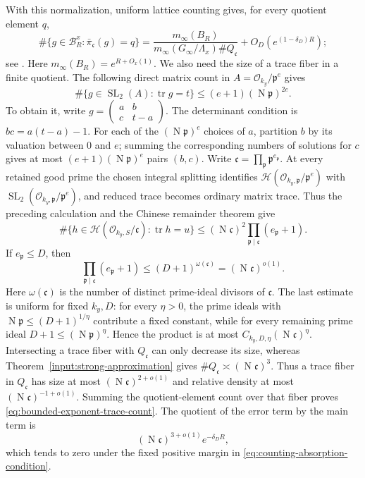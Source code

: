 \documentclass[11pt,reqno]{amsart}
\theoremstyle{definition}
\theoremstyle{remark}
\newcommand{\cO}{\mathcal O}
\newcommand{\cB}{\mathcal B}
\newcommand{\Tr}{\operatorname{tr}}
\newcommand{\SL}{\operatorname{SL}}
\newcommand{\Norm}{\operatorname{N}}
\begin{document}
With this normalization, uniform lattice counting gives, for every quotient
element \(q\),
\[
 \#\{g\in\cB_R^x:\bar\pi_{\mathfrak c}(g)=q\}
 =\frac{m_\infty(B_R)}
        {m_\infty(G_\infty/\Lambda_x)\#Q_{\mathfrak c}}
  +O_D(e^{(1-\delta_D)R});
\]
see \cite[Theorem~1.9 and Corollaries~1.11, 1.13]
{GorodnikNevoCounting}.  Here \(m_\infty(B_R)=e^{R+O_x(1)}\).  We also need
the size of a trace fiber in a finite quotient.  The following direct
matrix count in
\(A=\cO_{k_y}/\mathfrak p^e\) gives
\[
 \#\{g\in\SL_2(A):\Tr g=t\}\le(e+1)(\Norm\mathfrak p)^{2e}.
\]
To obtain it, write
\(g=\left(\begin{smallmatrix}a&b\\c&t-a\end{smallmatrix}\right)\).
The determinant condition is \(bc=a(t-a)-1\).  For each of the
\((\Norm\mathfrak p)^e\) choices of \(a\), partition \(b\) by its valuation
between \(0\) and \(e\); summing the corresponding numbers of solutions for
\(c\) gives at most \((e+1)(\Norm\mathfrak p)^e\) pairs \((b,c)\).
Write \(\mathfrak c=\prod_{\mathfrak p}\mathfrak p^{e_{\mathfrak p}}\).
At every retained good prime the chosen integral splitting identifies
\(\mathcal H(\cO_{k_y,\mathfrak p}/\mathfrak p^e)\) with
\(\SL_2(\cO_{k_y,\mathfrak p}/\mathfrak p^e)\), and reduced trace becomes
ordinary matrix trace.  Thus the preceding calculation and the Chinese
remainder theorem give
\[
 \#\{h\in\mathcal H(\cO_{k_y,S}/\mathfrak c):\Tr h=u\}
 \le (\Norm\mathfrak c)^2
       \prod_{\mathfrak p\mid\mathfrak c}(e_{\mathfrak p}+1).
\]
If \(e_{\mathfrak p}\le D\), then
\[
 \prod_{\mathfrak p\mid\mathfrak c}(e_{\mathfrak p}+1)
 \le (D+1)^{\omega(\mathfrak c)}
 = (\Norm\mathfrak c)^{o(1)}.
\]
Here \(\omega(\mathfrak c)\) is the number of distinct prime-ideal divisors
of \(\mathfrak c\).
The last estimate is uniform for fixed \(k_y,D\): for every \(\eta>0\),
the prime ideals with
\(\Norm\mathfrak p\le(D+1)^{1/\eta}\) contribute a fixed constant, while
for every remaining prime ideal
\(D+1\le(\Norm\mathfrak p)^\eta\).  Hence the product is at most
\(C_{k_y,D,\eta}(\Norm\mathfrak c)^\eta\).
Intersecting a trace fiber with \(Q_{\mathfrak c}\) can only decrease its
size, whereas Theorem~\ref{input:strong-approximation} gives
\(\#Q_{\mathfrak c}\asymp(\Norm\mathfrak c)^3\).  Thus a trace fiber in
\(Q_{\mathfrak c}\) has size at most
\((\Norm\mathfrak c)^{2+o(1)}\) and relative density at most
\((\Norm\mathfrak c)^{-1+o(1)}\).  Summing the quotient-element count over
that fiber proves \eqref{eq:bounded-exponent-trace-count}.  The quotient of
the error term by the main term is
\[
 (\Norm\mathfrak c)^{3+o(1)}e^{-\delta_D R},
\]
which tends to zero under the fixed positive margin in
\eqref{eq:counting-absorption-condition}.
\end{document}
